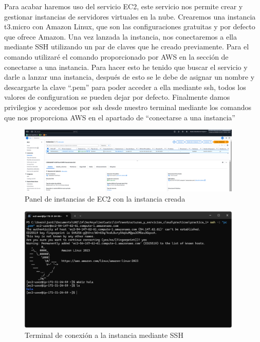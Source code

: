 \documentclass{article}
\begin{document}
	Para acabar haremos uso del servicio EC2, este servicio nos permite crear y gestionar instancias de servidores virtuales en la nube. Crearemos una instancia t3.micro con Amazon Linux, que son las configuraciones gratuitas y por defecto que ofrece Amazon. Una vez lanzada la instancia, nos conectaremos a ella mediante SSH utilizando un par de claves que he creado previamente. Para el comando utilizaré el comando proporcionado por AWS en la sección de conectarse a una instancia. Para hacer esto he tenido que buscar el servicio y darle a lanzar una instancia, después de esto se le debe de asignar un nombre y descargarte la clave ``.pem'' para poder acceder a ella mediante ssh, todos los valores de configuration se pueden dejar por defecto. Finalmente damos privilegios y accedemos por ssh desde nuestro terminal mediante los comandos que nos proporciona AWS en el apartado de ``conectarse a una instancia'' 


	\begin{figure}[H]
	\centering
	\includegraphics[width=0.95\textwidth]{tarea_final_1.png}
	\caption{Panel de instancias de EC2 con la instancia creada}
	\end{figure}

	\begin{figure}[H]
	\centering
	\includegraphics[width=0.95\textwidth]{tarea_final_2.png}
	\caption{Terminal de conexión a la instancia mediante SSH}
	\end{figure}
\end{document}
